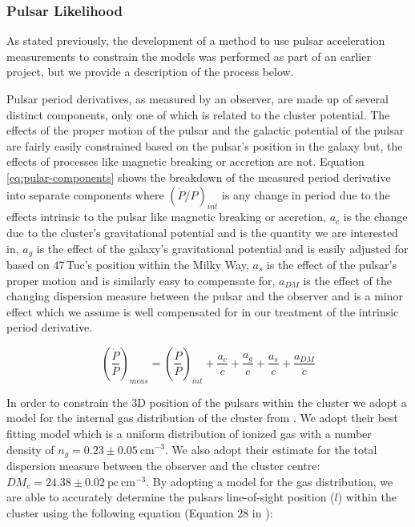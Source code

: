 \subsubsection{Pulsar Likelihood}

As stated previously, the development of a method to use pulsar acceleration measurements to
constrain the models was performed as part of an earlier project, but we provide a description
of the process below.


Pulsar period derivatives, as measured by an observer, are made up of several distinct components,
only one of which is related to the cluster potential. The effects of the proper motion of the
pulsar and the galactic potential of the pulsar are fairly easily constrained based on the pulsar's
position in the galaxy but, the effects of processes like magnetic breaking or accretion are not.
Equation \ref{eq:pular-components} shows the breakdown of the measured period derivative into
separate components where $(\dot{P}/P)_{int}$ is any change in period due to the effects intrinsic
to the pulsar like magnetic breaking or accretion, $a_c$ is the change due to the cluster's
gravitational potential and is the quantity we are interested in, $a_g$ is the effect of the
galaxy's gravitational potential and is easily adjusted for based on 47\,Tuc's position within the
Milky Way, $a_s$ is the effect of the pulsar's proper motion and is similarly easy to compensate
for, $a_{DM}$ is the effect of the changing dispersion measure between the pulsar and the observer
and is a minor effect which we assume is well compensated for in our treatment of the intrinsic
period derivative.

\begin{equation}
    \left(\frac{\dot{P}}{P}\right)_{meas} = \left(\frac{\dot{P}}{P}\right)_{int} + \frac{a_c}{c} +
    \frac{a_g}{c} + \frac{a_s}{c} + \frac{a_{DM}}{c}
    \label{eq:pular-components}
\end{equation}



In order to constrain the 3D position of the pulsars within the cluster we adopt a model for the
internal gas distribution of the cluster from \citet{Abbate2018}. We adopt their best fitting model
which is a uniform distribution of ionized gas with a number density of $n_g = 0.23 \pm 0.05 \
    \text{cm}^{-3}$. We also adopt their estimate for the total dispersion measure between the observer
and the cluster centre: $DM_c = 24.38 \pm 0.02 \ \mathrm{pc \ cm}^{-3}$. By adopting a model for the
gas distribution, we are able to accurately determine the pulsars line-of-sight position ($l$)
within the cluster using the following equation (Equation 28 in \citet{Abbate2018}):

